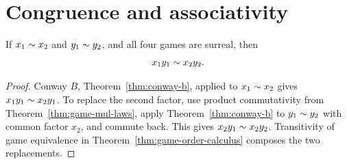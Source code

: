 \section{Congruence and associativity}

\begin{theorem}
  \label{thm:game-mul-congr}
  \leanok
  If \(x_1\sim x_2\) and \(y_1\sim y_2\), and all four games are surreal, then
  \[
    x_1y_1\sim x_2y_2.
  \]
\end{theorem}
\begin{proof}
  \leanok
  Conway \(B\), Theorem~\ref{thm:conway-b}, applied to
  \(x_1\sim x_2\) gives
  \(x_1y_1\sim x_2y_1\).  To replace the second factor, use product
  commutativity from Theorem~\ref{thm:game-mul-laws}, apply
  Theorem~\ref{thm:conway-b} to \(y_1\sim y_2\) with common factor \(x_2\),
  and commute back.  This gives
  \(x_2y_1\sim x_2y_2\).  Transitivity of game equivalence in
  Theorem~\ref{thm:game-order-calculus} composes the two replacements.
\end{proof}

